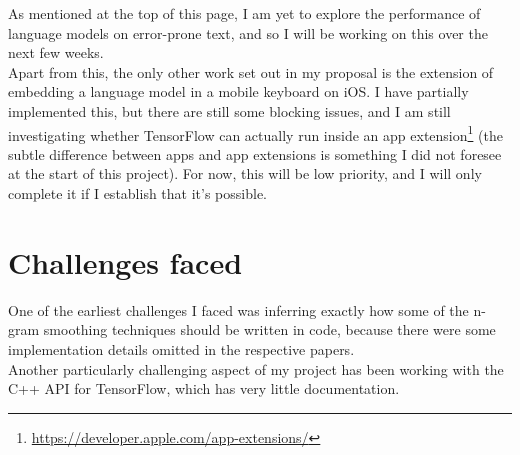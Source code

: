 \documentclass[a4paper, 12pt]{article}
\begin{document}
As mentioned at the top of this page, I am yet to explore the performance of language models on error-prone text, and so I will be working on this over the next few weeks. \\

Apart from this, the only other work set out in my proposal is the extension of embedding a language model in a mobile keyboard on iOS. I have partially implemented this, but there are still some blocking issues, and I am still investigating whether TensorFlow can actually run inside an app extension\footnote{\href{https://developer.apple.com/app-extensions/}{https://developer.apple.com/app-extensions/}} (the subtle difference between apps and app extensions is something I did not foresee at the start of this project). For now, this will be low priority, and I will only complete it if I establish that it's possible.

\section*{Challenges faced}

One of the earliest challenges I faced was inferring exactly how some of the n-gram smoothing techniques should be written in code, because there were some implementation details omitted in the respective papers. \\

Another particularly challenging aspect of my project has been working with the C++ API for TensorFlow, which has very little documentation.



\end{document}
